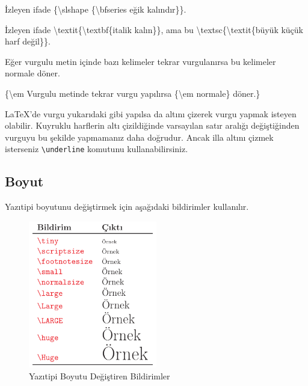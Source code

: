 \documentclass[
  10pt,
]{scrbook}
\newenvironment{Shaded}{}{}
\newcommand{\FunctionTok}[1]{\textcolor[rgb]{0.02,0.16,0.49}{#1}}
\newcommand{\NormalTok}[1]{#1}
\theoremstyle{definition}
\theoremstyle{definition}
\theoremstyle{definition}
\theoremstyle{definition}
\theoremstyle{remark}
\begin{document}
\begin{Shaded}
\begin{Highlighting}[]
\NormalTok{İzleyen ifade \{}\FunctionTok{\textbackslash{}slshape}\NormalTok{ \{}\FunctionTok{\textbackslash{}bfseries}\NormalTok{ eğik kalındır\}\}.}
\end{Highlighting}
\end{Shaded}

\begin{Shaded}
\begin{Highlighting}[]
\NormalTok{İzleyen ifade }\FunctionTok{\textbackslash{}textit}\NormalTok{\{}\FunctionTok{\textbackslash{}textbf}\NormalTok{\{italik kalın\}\}, ama bu}
\FunctionTok{\textbackslash{}textsc}\NormalTok{\{}\FunctionTok{\textbackslash{}textit}\NormalTok{\{büyük küçük harf değil\}\}.}
\end{Highlighting}
\end{Shaded}

Eğer vurgulu metin içinde bazı kelimeler tekrar vurgulanırsa bu kelimeler normale döner.

\begin{Shaded}
\begin{Highlighting}[]
\NormalTok{\{}\FunctionTok{\textbackslash{}em}\NormalTok{ Vurgulu metinde tekrar}
\NormalTok{vurgu yapılırsa \{}\FunctionTok{\textbackslash{}em}\NormalTok{ normale\}}
\NormalTok{döner.\}}
\end{Highlighting}
\end{Shaded}

LaTeX'de vurgu yukarıdaki gibi yapılsa da altını çizerek vurgu yapmak isteyen olabilir. Kuyruklu harflerin altı çizildiğinde varsayılan satır aralığı değiştiğinden vurguyu bu şekilde yapmamanız daha doğrudur. Ancak illa altını çizmek isterseniz \texttt{\textbackslash{}underline} komutunu kullanabilirsiniz.

\hypertarget{boyut}{%
\subsection{Boyut}\label{boyut}}

Yazıtipi boyutunu değiştirmek için aşağıdaki bildirimler kullanılır.

\begin{figure}
\centering
\includegraphics[width=0.5\textwidth,height=\textheight]{images/yazitipi8.png}
\caption{Yazıtipi Boyutu Değiştiren Bildirimler}
\end{figure}
\end{document}
